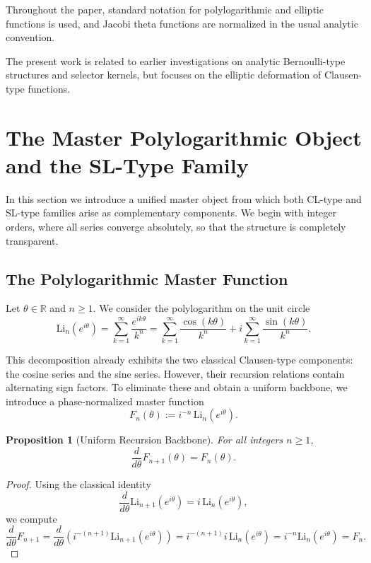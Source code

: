 \documentclass[11pt]{article}
\newtheorem{proposition}{Proposition}[section]
\begin{document}
  Throughout the paper, standard notation for polylogarithmic
and elliptic functions is used, and Jacobi theta functions
are normalized in the usual analytic convention.

  The present work is related to earlier investigations on analytic Bernoulli-type structures and selector kernels, but focuses on the elliptic deformation of Clausen-type functions.

\section{The Master Polylogarithmic Object and the SL-Type Family}

In this section we introduce a unified master object from which both
CL-type and SL-type families arise as complementary components.
We begin with integer orders, where all series converge absolutely,
so that the structure is completely transparent.

\subsection{The Polylogarithmic Master Function}

Let $\theta \in \mathbb{R}$ and $n \ge 1$.
We consider the polylogarithm on the unit circle~\cite{Lewin1981}\cite{ZagierPolylog}
\[
\mathrm{Li}_n(e^{i\theta})
=
\sum_{k=1}^{\infty}\frac{e^{ik\theta}}{k^n}
=
\sum_{k=1}^{\infty}\frac{\cos(k\theta)}{k^n}
+
i\sum_{k=1}^{\infty}\frac{\sin(k\theta)}{k^n}.
\]

This decomposition already exhibits the two classical
Clausen-type components:
the cosine series and the sine series.
However, their recursion relations contain alternating sign factors.
To eliminate these and obtain a uniform backbone,
we introduce a phase-normalized master function
\[
F_n(\theta)
:=
i^{-n}\,\mathrm{Li}_n(e^{i\theta}).
\]

\begin{proposition}[Uniform Recursion Backbone]
For all integers $n\ge1$,
\[
\frac{d}{d\theta}F_{n+1}(\theta)=F_n(\theta).
\]
\end{proposition}

\begin{proof}
Using the classical identity
\[
\frac{d}{d\theta}\mathrm{Li}_{n+1}(e^{i\theta})
=
i\,\mathrm{Li}_n(e^{i\theta}),
\]
we compute
\[
\frac{d}{d\theta}F_{n+1}
=
\frac{d}{d\theta}
\left(
i^{-(n+1)}\mathrm{Li}_{n+1}(e^{i\theta})
\right)
=
i^{-(n+1)} i\,\mathrm{Li}_n(e^{i\theta})
=
i^{-n}\mathrm{Li}_n(e^{i\theta})
=
F_n.
\]
\end{proof}
\end{document}
